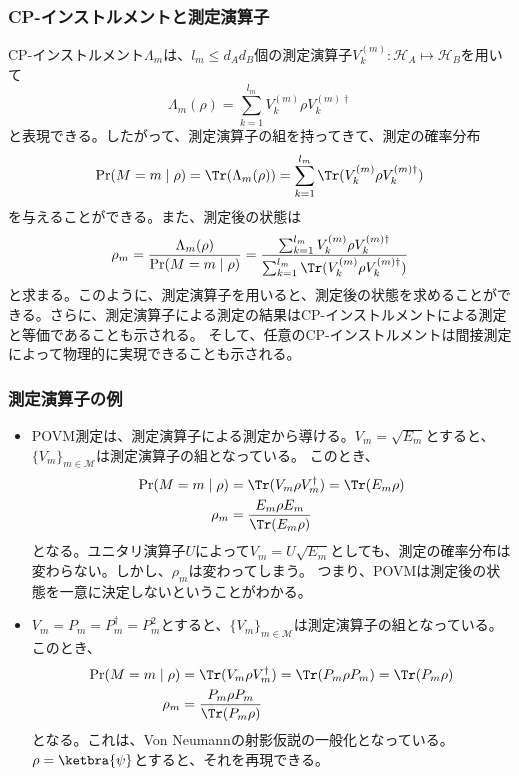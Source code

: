 \documentclass[10pt,aspectratio=169,xcolor=dvipsnames,table,dvipdfmx]{beamer}
\begin{document}
\begin{frame}
  \frametitle{CP-インストルメントと測定演算子}
  CP-インストルメント$\Lambda_m$は、$l_m\leq d_Ad_B$個の測定演算子$V_{k}^{(m)}\colon \mathcal{H}_A\mapsto \mathcal{H}_B$を用いて
  \begin{equation}
    \Lambda_m(\rho) = \sum_{k=1}^{l_m}V_{k}^{(m)}\rho V_{k}^{(m)\dagger}
  \end{equation}
  と表現できる。したがって、測定演算子の組を持ってきて、測定の確率分布
  \begin{equation}
    \Pr(M=m\mid \rho) = \Tr(\Lambda_m(\rho)) = \sum_{k=1}^{l_m}\Tr(V_{k}^{(m)}\rho V_{k}^{(m)\dagger})
  \end{equation}
  を与えることができる。また、測定後の状態は
  \begin{equation}
    \rho_m = \frac{\Lambda_m(\rho)}{\Pr(M=m\mid \rho)} = \frac{\sum_{k=1}^{l_m}V_{k}^{(m)}\rho V_{k}^{(m)\dagger}}{\sum_{k=1}^{l_m}\Tr(V_{k}^{(m)}\rho V_{k}^{(m)\dagger})}
  \end{equation}
  と求まる。このように、測定演算子を用いると、測定後の状態を求めることができる。さらに、測定演算子による測定の結果はCP-インストルメントによる測定と等価であることも示される。
  そして、任意のCP-インストルメントは間接測定によって物理的に実現できることも示される。
\end{frame}

\begin{frame}
  \frametitle{測定演算子の例}
  \begin{itemize}
    \item POVM測定は、測定演算子による測定から導ける。$V_m = \sqrt{E_m}$とすると、$\{V_m\}_{m\in \mathcal{M}}$は測定演算子の組となっている。
    このとき、
    \begin{align}
      \Pr(M=m\mid \rho) &= \Tr(V_m\rho V_m^{\dagger}) = \Tr(E_m\rho) \\
      \rho_m & = \frac{E_m\rho E_m}{\Tr(E_m\rho)}
    \end{align}
    となる。ユニタリ演算子$U$によって$V_m = U\sqrt{E_m}$としても、測定の確率分布は変わらない。しかし、$\rho_m$は変わってしまう。
    つまり、POVMは測定後の状態を一意に決定しないということがわかる。
    \item $V_m = P_m = P_m^{\dagger} = P_m^2$とすると、$\{V_m\}_{m\in \mathcal{M}}$は測定演算子の組となっている。
    このとき、
    \begin{align}
      \Pr(M=m\mid \rho) &= \Tr(V_m\rho V_m^{\dagger}) = \Tr(P_m\rho P_m) = \Tr(P_m\rho) \\
      \rho_m & = \frac{P_m\rho P_m}{\Tr(P_m\rho)}
    \end{align}
    となる。これは、Von Neumannの射影仮説の一般化となっている。$\rho=\ketbra{\psi}$とすると、それを再現できる。
  \end{itemize}

 
  

\end{frame}
\end{document}
